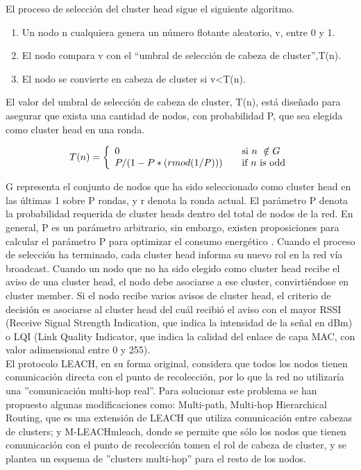 El proceso de selección del cluster head sigue el siguiente algoritmo.

\begin{enumerate}
 \item Un nodo n cualquiera genera un número flotante aleatorio, v, entre 0 y 1.
 \item El nodo compara v con el ``umbral de selección de cabeza de cluster'',T(n).
 \item El nodo se convierte en cabeza de cluster si v\textless T(n).
\end{enumerate}
 
El valor del umbral de selección de cabeza de cluster, T(n), está diseñado para asegurar que exista una cantidad de nodos, con probabilidad P, que sea elegida como cluster head en una ronda.

\[T(n) = \left\{ 
\begin{array}{l l}
  0 & \quad \mbox{si $n$ }\notin G\\
  P/(1-P*(r mod(1/P))) & \quad \mbox{if $n$ is odd}\\
\end{array} \right. \] 

G representa el conjunto de nodos que ha sido seleccionado como cluster head en las últimas 1 sobre P rondas, y r denota la ronda actual. El parámetro P denota la probabilidad requerida de cluster heads dentro del total de nodos de la red. En general, P es un parámetro arbitrario, sin embargo, existen proposiciones para calcular el parámetro P para optimizar el consumo energético \cite{LeachOptimo}. Cuando el proceso de selección ha terminado, cada cluster head informa su nuevo rol en la red vía broadcast. Cuando un nodo que no ha sido elegido como cluster head recibe el aviso de una cluster head, el nodo debe asociarse a ese cluster, convirtiéndose en cluster member. Si el nodo recibe varios avisos de cluster head, el criterio de decisión es asociarse al cluster head del cuál recibió el aviso con el mayor RSSI (Receive Signal Strength Indication, que indica la intensidad de la señal en dBm) o LQI (Link Quality Indicator, que indica la calidad del enlace de capa MAC, con valor adimensional entre 0 y 255).\\

El protocolo LEACH, en su forma original, considera que todos los nodos tienen comunicación directa con el punto de recolección, por lo que la red no utilizaría una ''comunicación multi-hop real''. Para solucionar este problema se han propuesto algunas modificaciones como: Multi-path, Multi-hop Hierarchical Routing\cite{mumhr}, que es una extensión de LEACH que utiliza comunicación entre cabezas de clusters; y M-LEACH{mleach}, donde se permite que sólo los nodos que tienen comunicación con el punto de recolección tomen el rol de cabeza de cluster, y se plantea un esquema de ''clusters multi-hop'' para el resto de los nodos.

